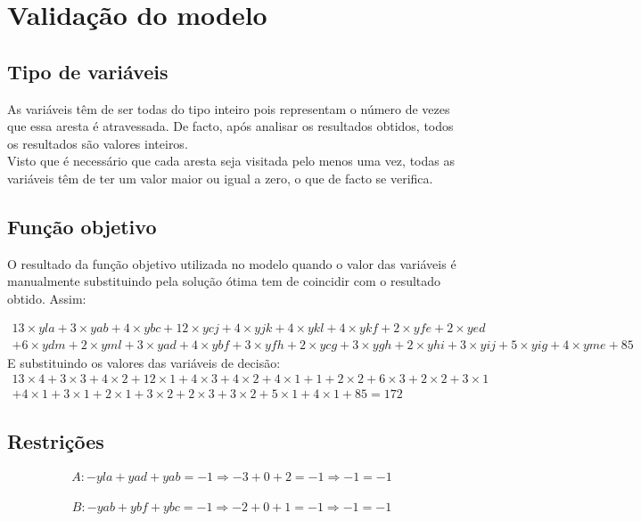 \documentclass[a4paper]{report}
\begin{document}
\pagebreak
\section{Validação do modelo}
\subsection{Tipo de variáveis}
As variáveis têm de ser todas do tipo inteiro pois representam o número
de vezes que essa aresta é atravessada. De facto, após analisar os resultados
obtidos, todos os resultados são valores inteiros.\\
Visto que é necessário que cada aresta seja visitada pelo menos uma
vez, todas as variáveis têm de ter um valor maior ou igual a zero, o
que de facto se verifica.

\subsection{Função objetivo}
O resultado da função objetivo utilizada no modelo quando o valor
das variáveis é manualmente substituindo pela solução ótima tem de 
coincidir com o resultado obtido.
Assim:

\begin{multline}
13\times yla + 3\times yab + 4\times ybc + 12\times ycj + 4\times
yjk + 4\times ykl + 4\times ykf + 2\times yfe + 2\times yed \\ + 6\times ydm +
2\times yml + 3\times yad + 4\times ybf + 3\times yfh + 2\times ycg +
3\times ygh + 2\times yhi + 3\times yij + 5\times yig + 4\times yme + 85
\end{multline}
E substituindo os valores das variáveis de decisão:
\begin{multline}
13\times 4 + 3\times 3 + 4\times 2 + 12\times 1 + 4\times
3 + 4\times 2 + 4\times 1 + 1 + 2\times 2 + 6\times 3 +
2\times 2 + 3\times 1 \\ + 4\times 1 + 3\times 1 + 2\times 1 +
3\times 2 + 2\times 3 + 3\times 2 + 5\times 1 + 4\times 1 + 85
= 172
\end{multline}

\subsection{Restrições}
\begin{multline}
A: - yla + yad + yab = -1
\Rightarrow - 3 + 0 + 2 = -1 
\Rightarrow -1 = -1
\end{multline}

\begin{multline}
B: - yab + ybf + ybc = -1
\Rightarrow - 2 + 0 + 1 = -1
\Rightarrow -1 = -1
\end{multline}
\end{document}
